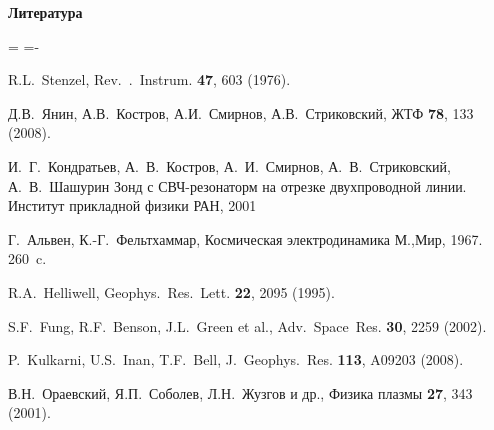 \documentclass[autoref,10pt]{disser}
\newcounter{enumv}
\renewcommand{\theenumv}{\arabic{enumv}}
\newenvironment{theotherbib1}[1][.]
{\begin{list}{\theenumv#1\hspace{5pt}}{
\begin{center}\bf\large Литература \end{center}
\usecounter{enumv}
\topsep=0pt\labelsep=2pt\itemsep=0pt\itemindent=\parindent
\listparindent=-\parindent}}
{\end{list}}
\begin{document}
\begin{theotherbib1}
\item R.L.~Stenzel, Rev.~.~Instrum. {\bf 47}, 603 (1976).\label{Stenzel}

\item Д.В.~Янин, А.В.~Костров, А.И.~Смирнов, А.В.~Стриковский, ЖТФ {\bf 78}, 133 (2008).\label{Yanin}

\item И.~Г.~Кондратьев, А.~В.~Костров, А.~И.~Смирнов, А.~В.~Стриковский, А.~В.~Шашурин Зонд с СВЧ-резонаторм на отрезке двухпроводной линии. \newblock Институт прикладной физики РАН, 2001\label{UHF_probe}

\item Г.~Альвен, К.-Г.~Фельтхаммар, Космическая электродинамика \newblock М.,Мир, 1967. 260~c.\label{Alfven}

\item R.A.~Helliwell, Geophys.~Res.~Lett. {\bf 22}, 2095 (1995).\label{Helliwell}

\item S.F.~Fung, R.F.~Benson, J.L.~Green et al., Adv.~Space~Res. {\bf 30}, 2259 (2002).\label{RPI}

\item P.~Kulkarni, U.S.~Inan, T.F.~Bell, J.~Geophys.~Res. {\bf 113}, A09203 (2008).\label{Kulkarni}

\item В.Н.~Ораевский, Я.П.~Соболев, Л.Н.~Жузгов и др., Физика плазмы {\bf 27}, 343 (2001). \label{Orajevskiy}
\end{theotherbib1}
\end{document}
